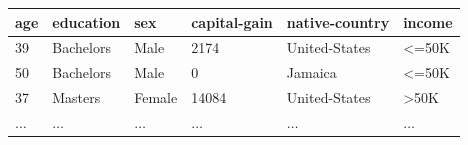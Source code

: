 \begin{table}[]
\small
\begin{tabular}{@{}llllll@{}}
\toprule
\textbf{age} & \textbf{education} & \textbf{sex} & \textbf{capital-gain} & \textbf{native-country} & \textbf{income}   \\ \midrule
39           & Bachelors          & Male         & 2174                  & United-States           & \textless{}=50K   \\
50           & Bachelors          & Male         & 0                     & Jamaica                 & \textless{}=50K   \\
37           & Masters            & Female       & 14084                 & United-States           & \textgreater{}50K   \\
$\dots$      & $\dots$            & $\dots$      & $\dots$               & $\dots$                 & $\dots$           \\ \bottomrule
\end{tabular}
\end{table}